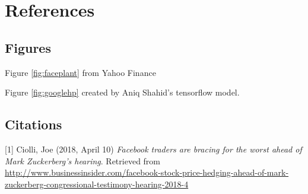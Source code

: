\documentclass{article}
\begin{document}
\section{References}

\small

\subsection{Figures}

Figure \ref{fig:faceplant} from Yahoo Finance

Figure \ref{fig:googlehp} created by Aniq Shahid's tensorflow model. 

\subsection{Citations}

[1] Ciolli, Joe (2018, April 10) \emph{Facebook traders are bracing for the worst ahead of Mark Zuckerberg's hearing}. Retrieved from \url{http://www.businessinsider.com/facebook-stock-price-hedging-ahead-of-mark-zuckerberg-congressional-testimony-hearing-2018-4}
\end{document}
